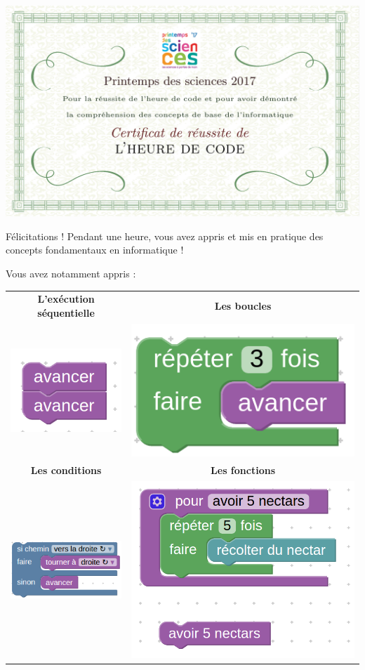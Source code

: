 \documentclass[11pt]{article}
\begin{document}
\includegraphics[width=\linewidth]{certificat.png}

\bigskip

Félicitations ! Pendant une heure, vous avez appris et mis en pratique des concepts fondamentaux en informatique !

\bigskip

Vous avez notamment appris : \newline

\begin{center}
\begin{tabular}{|c|c|}
    \hline
    \textbf{L'exécution séquentielle} & \textbf{Les boucles} \\
     \includegraphics[width=0.15\linewidth]{blocks_2moveForward.png} &
     \includegraphics[width=0.2\linewidth]{blocks_forloop.png} \\
   \hline
   \textbf{Les conditions} & \textbf{Les fonctions} \\
   \includegraphics[width=0.3\linewidth]{blocks_ifElse.png} &
   \includegraphics[width=0.3\linewidth]{blocks_function.png} \\
   \hline
\end{tabular}
\end{center}
\end{document}
